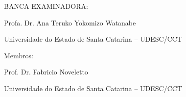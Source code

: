 

%
% 
%
\begin{folhadeaprovacao}



	\begin{center}
		{\selectfont\MakeTextUppercase{\normalsize\imprimirautor}}
	\end{center}
    \vfill
    
	\vfill
	\begin{center}
		{\selectfont\MakeTextUppercase{\imprimirtitulo}}
	\end{center}
	\vfill

    
%


\vfill
        
	 \begin{center}
	 	
    	{\selectfont BANCA EXAMINADORA: }
    	\vspace*{1.75cm}
    
		Profa. Dr. {} Ana {} Teruko Yokomizo Watanabe \par
		Universidade do Estado de Santa Catarina – UDESC/CCT
	 \end{center}
	
    {Membros:} 
    
	\begin{center}
		\vspace*{1.25cm}
		Prof. Dr. Fabricio Noveletto \par
		Universidade do Estado de Santa Catarina – UDESC/CCT
		

\end{center}
\end{folhadeaprovacao}
